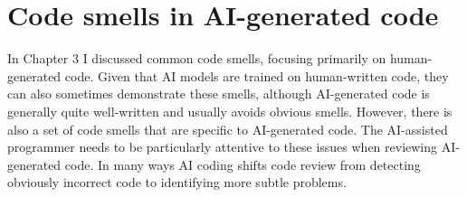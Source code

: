 \section{Code smells in AI-generated code}

In Chapter 3 I discussed common code smells, focusing primarily on human-generated code. Given that AI models are trained on human-written code, they can also sometimes demonstrate these smells, although AI-generated code is generally quite well-written and usually avoids obvious smells.  However, there is also a set of code smells that are specific to AI-generated code.  The AI-assisted programmer needs to be particularly attentive to these issues when reviewing AI-generated code.  In many ways AI coding shifts code review from detecting obviously incorrect code to identifying more subtle problems.

